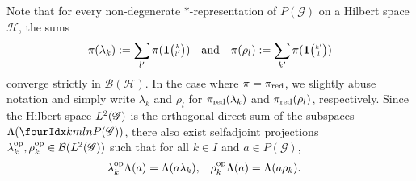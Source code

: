 Note that for every non-degenerate $*$-representation of $P(\mathscr{G})$ on a
Hilbert space $\mathcal{H}$, the sums
  \begin{align*}
    \pi(\lambda_{k}) := \sum_{l'} \pi(\mathbf{1}{\tiny {\begin{pmatrix} k\\l'\end{pmatrix}}}) \quad \text{and} \quad
\pi(\rho_{l}) := \sum_{k'} \pi(\mathbf{1}{\tiny {\begin{pmatrix} k'\\l\end{pmatrix}}})
  \end{align*}
  converge strictly in $\mathcal{B}(\mathcal{H})$. 
  In the case where $\pi=\pi_{\operatorname{\mathrm{red}}}$, we slightly abuse notation and
  simply write $\lambda_{k}$ and $\rho_{l}$ for
  $\pi_{\operatorname{\mathrm{red}}}(\lambda_{k})$ and $\pi_{\operatorname{\mathrm{red}}}(\rho_{l})$,
  respectively. Since the  Hilbert space $L^{2}(\mathscr{G})$ is the orthogonal direct sum of the
subspaces $\Lambda(\Gr{P(\mathscr{G})}{k}{l}{m}{n})$, 
there also exist selfadjoint projections
$\lambda_{k}^{\operatorname{\mathrm{op}}},\rho_{k}^{\operatorname{\mathrm{op}}}\in {\cal
  B}(L^{2}(\mathscr{G}))$ such that  for all $k\in I$ and $a\in P(\mathscr{G})$,
\begin{align*}
  \lambda^{\operatorname{\mathrm{op}}}_{k}\Lambda(a) &= \Lambda(a\lambda_{k}), &
  \rho_{k}^{\operatorname{\mathrm{op}}}\Lambda(a) &= \Lambda(a\rho_{k}).
\end{align*}



